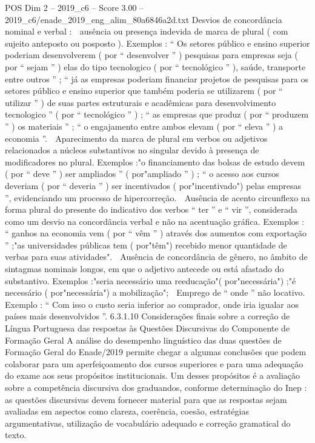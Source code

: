 \begin{textsample}{POS Dim 2 – 2019\_c6 – Score 3.00 – 2019\_c6/enade\_2019\_eng\_alim\_80a6846a2d.txt}
Desvios de concordância nominal e verbal :  ausência ou presença indevida de marca de plural ( com sujeito anteposto ou posposto ).
Exemplos : “ Os setores público e ensino superior poderiam desenvolverem ( por “ desenvolver ” ) pesquisas para empresas seja ( por “ sejam ” ) elas do tipo tecnologico ( por “ tecnológico ” ), saúde, transporte entre outros ” ; “ já as empresas poderiam financiar projetos de pesquisas para os setores público e ensino superior que também poderia se utilizarem ( por “ utilizar ” ) de suas partes estruturais e acadêmicas para desenvolvimento tecnologico ” ( por “ tecnológico ” ) ; “ as empresas que produz ( por “ produzem ” ) os materiais ” ; “ o engajamento entre ambos elevam ( por “ eleva ” ) a economia ”.  Aparecimento da marca de plural em verbos ou adjetivos relacionados a núcleos substantivos no singular devido à presença de modificadores no plural.
Exemplos :"o financiamento das bolsas de estudo devem ( por “ deve ” ) ser ampliados ” ( por"ampliado ” ) ; “ o acesso aos cursos deveriam ( por “ deveria ” ) ser incentivados ( por"incentivado") pelas empresas ”, evidenciando um processo de hipercorreção.  Ausência de acento circunflexo na forma plural do presente do indicativo dos verbos “ ter ” e “ vir ”, considerada como um desvio na concordância verbal e não na acentuação gráfica.
Exemplos : “ ganhos na economia vem ( por “ vêm ” ) através dos aumentos com exportação ” ;"as universidades públicas tem ( por"têm") recebido menor quantidade de verbas para suas atividades".  Ausência de concordância de gênero, no âmbito de sintagmas nominais longos, em que o adjetivo antecede ou está afastado do substantivo.
Exemplos :"seria necessário uma reeducação"( por"necessária") ;"é necessário ( por"necessária") a mobilização";  Emprego de “ onde ” não locativo.
Exemplo : “ Com isso o custo seria inferior ao comprador, onde iria igualar aos países mais desenvolvidos ”. 6.3.1.10 Considerações finais sobre a correção de Língua Portuguesa das respostas às Questões Discursivas do Componente de Formação Geral A análise do desempenho linguístico das duas questões de Formação Geral do Enade/2019 permite chegar a algumas conclusões que podem colaborar para um aperfeiçoamento dos cursos superiores e para uma adequação do exame aos seus propósitos institucionais.
Um desses propósitos é a avaliação sobre a competência discursiva dos graduandos, conforme determinação do Inep : as questões discursivas devem fornecer material para que as respostas sejam avaliadas em aspectos como clareza, coerência, coesão, estratégias argumentativas, utilização de vocabulário adequado e correção gramatical do texto.

\end{textsample}
